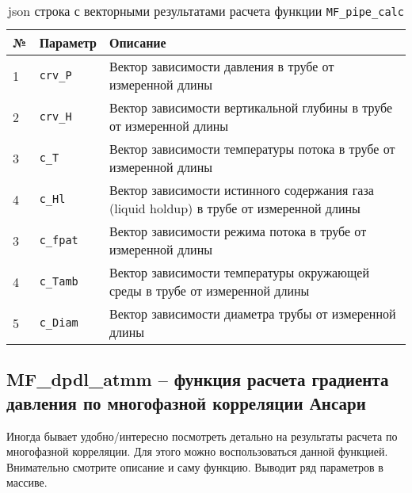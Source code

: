 \begin{table}[H]
	\caption{json строка с векторными результатами расчета функции \texttt{MF_pipe_calc} }
	\label{table:res_list_MF_pipe_calc_crv}
	\begin{tabular}{p{}p{}p{}}
		\hline
		№& Параметр & Описание  \\ \hline
		
		1 & \texttt{crv_P} & Вектор зависимости давления в трубе от измеренной длины    \\ \hline
		2 & \texttt{crv_Н} & Вектор зависимости вертикальной глубины в трубе от измеренной длины     \\ \hline
		3 & \texttt{c_T} & Вектор зависимости температуры потока в трубе от измеренной длины  \\ \hline
		4 & \texttt{c_Hl} & Вектор зависимости истинного содержания газа (liquid holdup) в трубе от измеренной длины      \\ \hline
		3 & \texttt{c_fpat} & Вектор зависимости режима потока в трубе от измеренной длины     \\ \hline
		4 & \texttt{c_Tamb} & Вектор зависимости температуры окружающей среды в трубе от измеренной длины     \\ \hline
		5 & \texttt{c_Diam} &Вектор зависимости диаметра трубы от измеренной длины    \\ \hline	
		
	\end{tabular}
\end{table}



\subsection{MF\_dpdl\_atmm – функция расчета градиента давления по многофазной корреляции Ансари}  
Иногда бывает удобно/интересно посмотреть детально на результаты расчета по многофазной корреляции. Для этого можно воспользоваться данной функцией. Внимательно смотрите описание и саму функцию. Выводит ряд параметров в массиве.



